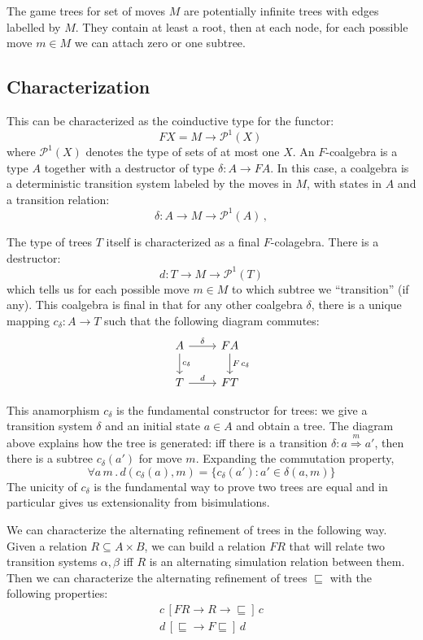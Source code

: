 \documentclass[11pt]{article}
\begin{document}
The game trees for set of moves $M$
are potentially infinite trees with
edges labelled by $M$.
They contain at least a root,
then at each node,
for each possible move $m \in M$
we can attach zero or one subtree.

\subsection{Characterization}

This can be characterized as the coinductive type for the functor:
\[ F X = M \rightarrow \mathcal{P}^1(X)\, \]
where $\mathcal{P}^1(X)$ denotes the type of sets of at most one $X$.
An $F$-coalgebra is a type $A$
together with a destructor of type $\delta : A \rightarrow F A$.
In this case, a coalgebra is a deterministic transition system
labeled by the moves in $M$,
with states in $A$ and a transition relation:
\[ \delta : A \rightarrow M \rightarrow \mathcal{P}^1(A) \, , \]

The type of trees $T$ itself is characterized as a final $F$-colagebra.
There is a destructor:
\[ d : T \rightarrow M \rightarrow \mathcal{P}^1(T) \]
which tells us for each possible move $m \in M$
to which subtree we ``transition'' (if any).
This coalgebra is final in that for any other coalgebra $\delta$,
there is a unique mapping $c_{\delta} : A \rightarrow T$
such that the following diagram commutes:
\[
  \begin{tikzcd}
    A \arrow[r, "\delta"]
      \arrow[d, "c_{\delta}"] &
    F A \arrow[d, "F \, c_\delta"] \\
    T \arrow[r, "d"] &
    F T
  \end{tikzcd}
\]

This anamorphism $c_\delta$ is
the fundamental constructor for trees:
we give a transition system $\delta$ and an initial state $a \in A$
and obtain a tree.
The diagram above explains how the tree is generated:
iff there is a transition $\delta : a \stackrel{m}{\Longrightarrow} a'$,
then there is a subtree $c_{\delta}(a')$ for move $m$.
Expanding the commutation property,
\[
  \forall a \, m \,.\,
    d(c_{\delta}(a), m) = \{ c_{\delta}(a') : a' \in \delta(a, m) \}
\]
The unicity of $c_\delta$ is
the fundamental way to prove two trees are equal
and in particular gives us extensionality from bisimulations.

We can characterize the alternating refinement of trees
in the following way.
Given a relation $R \subseteq A \times B$,
we can build a relation $F R$ that will relate
two transition systems $\alpha, \beta$ iff
$R$ is an alternating simulation relation between them.
Then we can characterize the alternating refinement of trees $\sqsubseteq$
with the following properties:
\begin{gather*}
  c \, [F R \rightarrow R \rightarrow {\sqsubseteq}] \, c \\
  d \, [{\sqsubseteq} \rightarrow F {\sqsubseteq}] \, d
\end{gather*}
\end{document}
